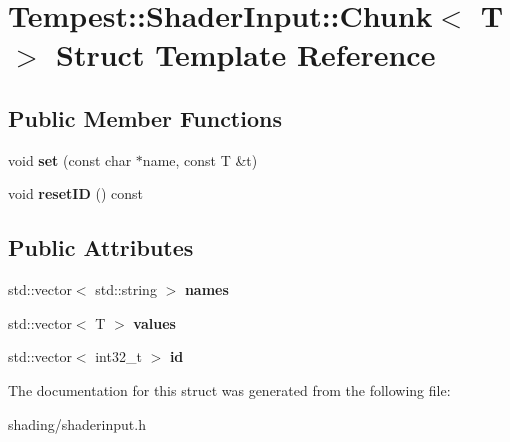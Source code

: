 \hypertarget{struct_tempest_1_1_shader_input_1_1_chunk}{\section{Tempest\+:\+:Shader\+Input\+:\+:Chunk$<$ T $>$ Struct Template Reference}
\label{struct_tempest_1_1_shader_input_1_1_chunk}
}
\subsection*{Public Member Functions}
\begin{DoxyCompactItemize}
\item 
\hypertarget{struct_tempest_1_1_shader_input_1_1_chunk_ac23fd7c6fef14a4a5d48bf5dea9d1b04}{void {\bfseries set} (const char $\ast$name, const T \&t)}\label{struct_tempest_1_1_shader_input_1_1_chunk_ac23fd7c6fef14a4a5d48bf5dea9d1b04}

\item 
\hypertarget{struct_tempest_1_1_shader_input_1_1_chunk_abb431b93730e9a70286a965ba9237944}{void {\bfseries reset\+I\+D} () const }\label{struct_tempest_1_1_shader_input_1_1_chunk_abb431b93730e9a70286a965ba9237944}

\end{DoxyCompactItemize}
\subsection*{Public Attributes}
\begin{DoxyCompactItemize}
\item 
\hypertarget{struct_tempest_1_1_shader_input_1_1_chunk_ad43bbeb5b9e5fb426b7b239269663e5e}{std\+::vector$<$ std\+::string $>$ {\bfseries names}}\label{struct_tempest_1_1_shader_input_1_1_chunk_ad43bbeb5b9e5fb426b7b239269663e5e}

\item 
\hypertarget{struct_tempest_1_1_shader_input_1_1_chunk_a3c012d4488bfab80fe74714a839f17c5}{std\+::vector$<$ T $>$ {\bfseries values}}\label{struct_tempest_1_1_shader_input_1_1_chunk_a3c012d4488bfab80fe74714a839f17c5}

\item 
\hypertarget{struct_tempest_1_1_shader_input_1_1_chunk_a32f8115938485065f050b490e82a81d8}{std\+::vector$<$ int32\+\_\+t $>$ {\bfseries id}}\label{struct_tempest_1_1_shader_input_1_1_chunk_a32f8115938485065f050b490e82a81d8}

\end{DoxyCompactItemize}


The documentation for this struct was generated from the following file\+:\begin{DoxyCompactItemize}
\item 
shading/shaderinput.\+h\end{DoxyCompactItemize}
